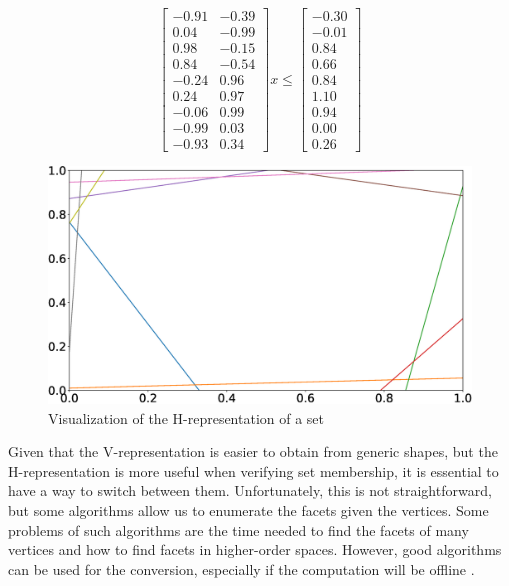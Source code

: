 \begin{equation}
	\label{eq:h-rep-example}
	\begin{bmatrix}
		-0.91 & -0.39 \\
		0.04  & -0.99 \\
		0.98  & -0.15 \\
		0.84  & -0.54 \\
		-0.24 & 0.96  \\
		0.24  & 0.97  \\
		-0.06 & 0.99  \\
		-0.99 & 0.03  \\
		-0.93 & 0.34
	\end{bmatrix}x \leq
	\begin{bmatrix}
		-0.30 \\
		-0.01 \\
		0.84  \\
		0.66  \\
		0.84  \\
		1.10  \\
		0.94  \\
		0.00  \\
		0.26
	\end{bmatrix}
\end{equation}

\begin{figure}[!htb]
	\centering
	\includegraphics[width=\linewidth]{imgs/h-rep}
	\caption{Visualization of the H-representation of a set}%
	\label{fig:h-rep-example}
\end{figure}

Given that the V-representation is easier to obtain from generic shapes, but the
H-representation is more useful when verifying set membership, it is essential
to have a way to switch between them. Unfortunately, this is not
straightforward, but some algorithms allow us to enumerate the facets given the
vertices. Some problems of such algorithms are the time needed to find the
facets of many vertices and how to find facets in higher-order spaces. However,
good algorithms can be used for the conversion, especially if the computation
will be offline
\parencite{avis.bremner.ea:how,graham.frances-yao:finding,lee:on,mccallum.avis:linear}.

